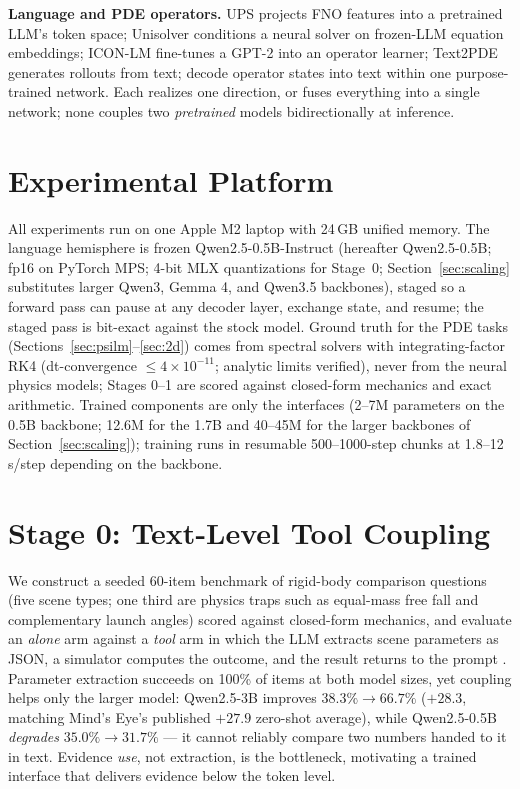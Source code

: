 \documentclass[11pt]{article}
\begin{document}
\textbf{Language and PDE operators.} UPS \citep{shen2024ups} projects FNO features into a pretrained LLM's token space; Unisolver \citep{zhou2025unisolver} conditions a neural solver on frozen-LLM equation embeddings; ICON-LM \citep{yang2025iconlm} fine-tunes a GPT-2 into an operator learner; Text2PDE \citep{zhou2025text2pde} generates rollouts from text; \citet{negrini2025multimodalpde} decode operator states into text within one purpose-trained network. Each realizes one direction, or fuses everything into a single network; none couples two \emph{pretrained} models bidirectionally at inference.

\section{Experimental Platform}
All experiments run on one Apple M2 laptop with 24\,GB unified memory. The language hemisphere is frozen Qwen2.5-0.5B-Instruct \citep{qwen2025qwen25} (hereafter Qwen2.5-0.5B; fp16 on PyTorch MPS; 4-bit MLX quantizations for Stage~0; Section~\ref{sec:scaling} substitutes larger Qwen3, Gemma 4, and Qwen3.5 backbones), staged so a forward pass can pause at any decoder layer, exchange state, and resume; the staged pass is bit-exact against the stock model. Ground truth for the PDE tasks (Sections~\ref{sec:psilm}--\ref{sec:2d}) comes from spectral solvers with integrating-factor RK4 (dt-convergence $\le 4\times10^{-11}$; analytic limits verified), never from the neural physics models; Stages 0--1 are scored against closed-form mechanics and exact arithmetic. Trained components are only the interfaces (2--7M parameters on the 0.5B backbone; 12.6M for the 1.7B and 40--45M for the larger backbones of Section~\ref{sec:scaling}); training runs in resumable 500--1000-step chunks at 1.8--12\,s/step depending on the backbone.

\section{Stage 0: Text-Level Tool Coupling}
\label{sec:stage0}
We construct a seeded 60-item benchmark of rigid-body comparison questions (five scene types; one third are physics traps such as equal-mass free fall and complementary launch angles) scored against closed-form mechanics, and evaluate an \emph{alone} arm against a \emph{tool} arm in which the LLM extracts scene parameters as JSON, a simulator computes the outcome, and the result returns to the prompt \citep{liu2023mindseye}. Parameter extraction succeeds on 100\% of items at both model sizes, yet coupling helps only the larger model: Qwen2.5-3B improves $38.3\%\!\to\!66.7\%$ ($+28.3$, matching Mind's Eye's published $+27.9$ zero-shot average), while Qwen2.5-0.5B \emph{degrades} $35.0\%\!\to\!31.7\%$ --- it cannot reliably compare two numbers handed to it in text. Evidence \emph{use}, not extraction, is the bottleneck, motivating a trained interface that delivers evidence below the token level.
\end{document}
